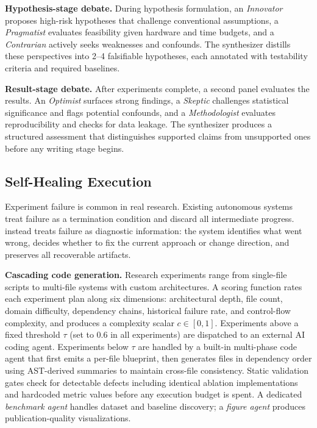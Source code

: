\noindent \textbf{Hypothesis-stage debate.}
During hypothesis formulation, an \emph{Innovator} proposes high-risk hypotheses that challenge conventional assumptions, a \emph{Pragmatist} evaluates feasibility given hardware and time budgets, and a \emph{Contrarian} actively seeks weaknesses and confounds.
The synthesizer distills these perspectives into 2--4 falsifiable hypotheses, each annotated with testability criteria and required baselines.

\noindent \textbf{Result-stage debate.}
After experiments complete, a second panel evaluates the results.
An \emph{Optimist} surfaces strong findings, a \emph{Skeptic} challenges statistical significance and flags potential confounds, and a \emph{Methodologist} evaluates reproducibility and checks for data leakage.
The synthesizer produces a structured assessment that distinguishes supported claims from unsupported ones before any writing stage begins.

\vspace{-0.3em}
\subsection{Self-Healing Execution}
\label{sec:selfheal}
\vspace{-0.3em}

Experiment failure is common in real research.
Existing autonomous systems treat failure as a termination condition and discard all intermediate progress.
\system{} instead treats failure as diagnostic information: the system identifies what went wrong, decides whether to fix the current approach or change direction, and preserves all recoverable artifacts.

\noindent \textbf{Cascading code generation.}
Research experiments range from single-file scripts to multi-file systems with custom architectures.
A scoring function rates each experiment plan along six dimensions: architectural depth, file count, domain difficulty, dependency chains, historical failure rate, and control-flow complexity, and produces a complexity scalar $c \in [0,1]$.
Experiments above a fixed threshold $\tau$ (set to $0.6$ in all experiments) are dispatched to an external AI coding agent.
Experiments below $\tau$ are handled by a built-in multi-phase code agent that first emits a per-file blueprint, then generates files in dependency order using AST-derived summaries to maintain cross-file consistency.
Static validation gates check for detectable defects including identical ablation implementations and hardcoded metric values before any execution budget is spent.
A dedicated \emph{benchmark agent} handles dataset and baseline discovery; a \emph{figure agent} produces publication-quality visualizations.

